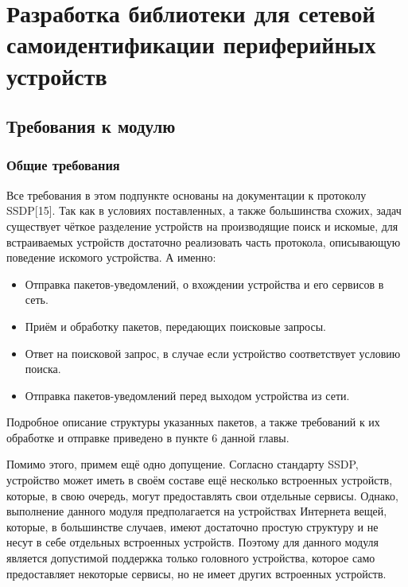 \chapter{Разработка библиотеки для сетевой самоидентификации периферийных устройств}

\section{Требования к модулю}
	
\subsection{Общие требования}

Все требования в этом подпункте основаны на документации к протоколу SSDP[15].
Так как в условиях поставленных, а также большинства схожих, задач существует чёткое разделение устройств на производящие поиск и искомые, для встраиваемых устройств достаточно реализовать часть протокола, описывающую поведение искомого устройства.
А именно:
\begin{itemize}
	\item Отправка пакетов-уведомлений, о вхождении устройства и его сервисов в сеть.
	\item Приём и обработку пакетов, передающих поисковые запросы.
	\item Ответ на поисковой запрос, в случае если устройство соответствует условию поиска.
	\item Отправка пакетов-уведомлений перед выходом устройства из сети.
\end{itemize}
Подробное описание структуры указанных пакетов, а также требований к их обработке и отправке приведено в пункте 6 данной главы.

Помимо этого, примем ещё одно допущение.
Согласно стандарту SSDP, устройство может иметь в своём составе ещё несколько встроенных устройств, которые, в свою очередь, могут предоставлять свои отдельные сервисы.
Однако, выполнение данного модуля предполагается на устройствах Интернета вещей, которые, в большинстве случаев, имеют достаточно простую структуру и не несут в себе отдельных встроенных устройств.
Поэтому для данного модуля является допустимой поддержка только головного устройства, которое само предоставляет некоторые сервисы, но не имеет других встроенных устройств.

